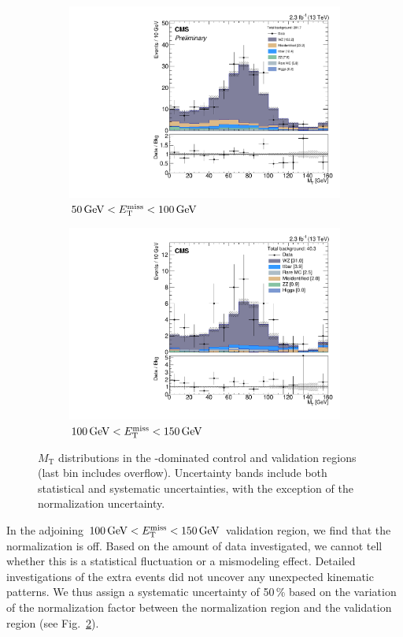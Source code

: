 \begin{figure}
\begin{center}
	\begin{subfigure}[b]{.7\textwidth}
		\includegraphics[width=\textwidth]{Background/bkg_WZ/WZ_MET50to100_MT}
		\caption{$50\,\text{Ge\hspace{-.08em}V} < E_{\mathrm{T}}^{\text{miss}} < 100\,\text{Ge\hspace{-.08em}V}$} \label{fig:WZ/MET50to100_MT}
	\end{subfigure}
	\begin{subfigure}[b]{.7\textwidth}
		\includegraphics[width=\textwidth]{Background/bkg_WZ/WZ_MET100to150_MT}
		\caption{$100\,\text{Ge\hspace{-.08em}V} < E_{\mathrm{T}}^{\text{miss}} < 150\,\text{Ge\hspace{-.08em}V}$} \label{fig:WZ/MET100to150_MT}
	\end{subfigure}
	\caption{$M_\textrm{T}$ distributions in the \WZ-dominated control and validation regions (last bin includes overflow). Uncertainty bands include both statistical and systematic uncertainties, with the exception of the \WZ normalization uncertainty.
	\label{fig:WZ}}
\end{center}
\end{figure}

In the adjoining $100\,\text{Ge\hspace{-.08em}V} < E_{\mathrm{T}}^{\text{miss}} < 150\,\text{Ge\hspace{-.08em}V}$ validation region, we find that the normalization is off. Based on the amount of data investigated, we cannot tell whether this is a statistical fluctuation or a mismodeling effect. Detailed investigations of the extra events did not uncover any unexpected kinematic patterns. We thus assign a systematic uncertainty of 50\,\% based on the variation of the normalization factor between the normalization region and the validation region (see Fig.~\ref{fig:WZ/MET100to150_MT}).
